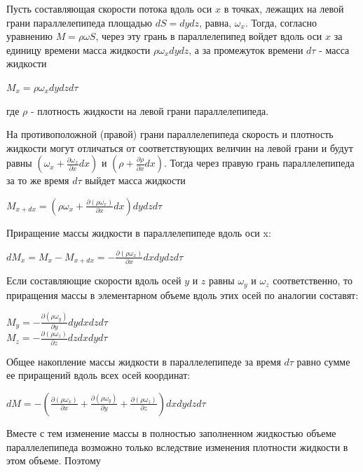 \documentclass[12pt, a4paper]{article}
\begin{document}
	\par Пусть составляющая скорости потока вдоль оси \( x \) в точках, лежащих на левой грани параллелепипеда площадью \( dS = dydz \), равна, \( \omega_x \). Тогда, согласно уравнению \( M = \rho \omega S \), через эту грань в параллелепипед войдет вдоль оси \( x \) за единицу времени масса жидкости \( \rho \omega_x dydz \), а за промежуток времени \( d\tau \) - масса жидкости
	\begin{center}
		\( M_x = \rho \omega_x dydzd\tau \)
	\end{center}
	где \( \rho \) - плотность жидкости на левой грани параллелепипеда.
	\par На противоположной (правой) грани параллелепипеда скорость и плотность жидкости могут отличаться от соответствующих величин на левой грани и будут равны \( (\omega_x + \frac{\partial \omega_x}{\partial x} dx) \) и \( (\rho + \frac{\partial \rho}{\partial x} dx)\). Тогда через правую грань параллелепипеда за то же время \( d\tau \) выйдет масса жидкости
	\begin{center}
		\( M_{x+dx} = (\rho \omega_x + \frac{\partial (\rho \omega_x)}{\partial x} dx) dydzd\tau \)
	\end{center}
	\par Приращение массы жидкости в параллелепипеде вдоль оси x:
	\begin{center}
		\( dM_x = M_x - M_{x+dx} = -\frac{\partial (\rho \omega_x)}{\partial x} dxdydzd\tau \)
	\end{center}
	\par Если составляющие скорости вдоль осей \( y \) и \( z \) равны \( \omega_y \) и \( \omega_z \) соответственно, то приращения массы в элементарном объеме вдоль этих осей по аналогии составят:
	\begin{center}
		\( M_y = -\frac{\partial (\rho \omega_y)}{\partial y} dydxdzd\tau \) \\
		\( M_z = -\frac{\partial (\rho \omega_z)}{\partial z} dzdxdyd\tau \)
	\end{center}
	\par Общее накопление массы жидкости в параллелепипеде за время \( d\tau \) равно сумме ее приращений вдоль всех осей координат:
	\begin{center}
		\( dM = - (\frac{\partial (\rho \omega_x)}{\partial x} + \frac{\partial (\rho \omega_y)}{\partial y} + \frac{\partial (\rho \omega_z)}{\partial z}) dxdydzd\tau \)
	\end{center}
	\par Вместе с тем изменение массы в полностью заполненном жидкостью объеме параллелепипеда возможно только вследствие изменения плотности жидкости в этом объеме. Поэтому
\end{document}
